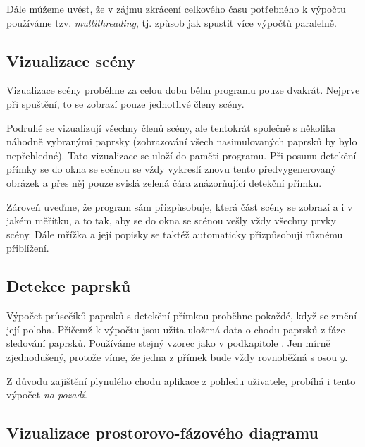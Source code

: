 Dále můžeme uvést, že v zájmu zkrácení celkového času potřebného k výpočtu používáme tzv. \emph{multithreading}, tj. způsob jak spustit více výpočtů paralelně.

\subsection{Vizualizace scény}

Vizualizace scény proběhne za celou dobu běhu programu pouze dvakrát. Nejprve při spuštění, to se zobrazí pouze jednotlivé členy scény.


Podruhé se vizualizují všechny členů scény, ale tentokrát společně s několika náhodně vybranými paprsky (zobrazování všech nasimulovaných paprsků by bylo nepřehledné). Tato vizualizace se uloží do paměti programu. Při posunu detekční přímky se do okna se scénou se vždy vykreslí znovu tento předvygenerovaný obrázek a přes něj pouze svislá zelená čára znázorňující detekční přímku.


Zároveň uveďme, že program sám přizpůsobuje, která část scény se zobrazí a i v jakém měřítku, a to tak, aby se do okna se scénou vešly vždy všechny prvky scény. Dále mřížka a její popisky se taktéž automaticky přizpůsobují různému přiblížení.


\subsection{Detekce paprsků}

Výpočet průsečíků paprsků s detekční přímkou proběhne pokaždé, když se změní její poloha. Přičemž k výpočtu jsou užita uložená data o chodu paprsků z fáze sledování paprsků. Používáme stejný vzorec jako v podkapitole . Jen mírně zjednodušený, protože víme, že jedna z přímek bude vždy rovnoběžná s osou $y$.

Z důvodu zajištění plynulého chodu aplikace z pohledu uživatele, probíhá i tento výpočet \emph{na pozadí}.


\subsection{Vizualizace prostorovo-fázového diagramu}

